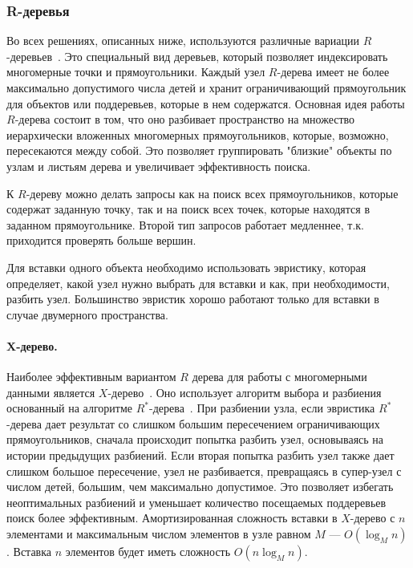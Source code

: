 \documentclass[14pt]{article}
\begin{document}
\subsubsection{R-деревья}
Во всех решениях, описанных ниже, используются различные вариации $R$-деревьев~\cite{r-tree}. Это специальный вид деревьев, который позволяет индексировать многомерные точки и прямоугольники. Каждый узел $R$-дерева имеет не более максимально допустимого числа детей и хранит ограничивающий прямоугольник для объектов или поддеревьев, которые в нем содержатся. Основная идея работы $R$-дерева состоит в том, что оно разбивает пространство на множество иерархически вложенных многомерных прямоугольников, которые, возможно, пересекаются между собой. Это позволяет группировать "близкие" объекты по узлам и листьям дерева и увеличивает эффективность поиска.

К $R$-дереву можно делать запросы как на поиск всех прямоугольников, которые содержат заданную точку, так и на поиск всех точек, которые находятся в заданном прямоугольнике. Второй тип запросов работает медленнее, т.к. приходится проверять больше вершин.

Для вставки одного объекта необходимо использовать эвристику, которая определяет, какой узел нужно выбрать для вставки и как, при необходимости, разбить узел. Большинство эвристик хорошо работают только для вставки в случае двумерного пространства.

\paragraph{X-дерево.} Наиболее эффективным вариантом $R$ дерева для работы с многомерными данными является $X$-дерево~\cite{x-tree}. Оно использует алгоритм выбора и разбиения основанный на алгоритме $R^*$-дерева~\cite{r-star-tree}. При разбиении узла, если эвристика $R^*$-дерева дает результат со слишком большим пересечением ограничивающих прямоугольников, сначала происходит попытка разбить узел, основываясь на истории предыдущих разбиений. Если вторая попытка разбить узел также дает слишком большое пересечение, узел не разбивается, превращаясь в супер-узел с числом детей, большим, чем максимально допустимое. Это позволяет избегать неоптимальных разбиений и уменьшает количество посещаемых поддеревьев поиск более эффективным. Амортизированная сложность вставки в $X$-дерево с $n$ элементами и максимальным числом элементов в узле равном $M$ --- $O(\log_M n)$. Вставка $n$ элементов будет иметь сложность $O(n\log_M n)$.
\end{document}
